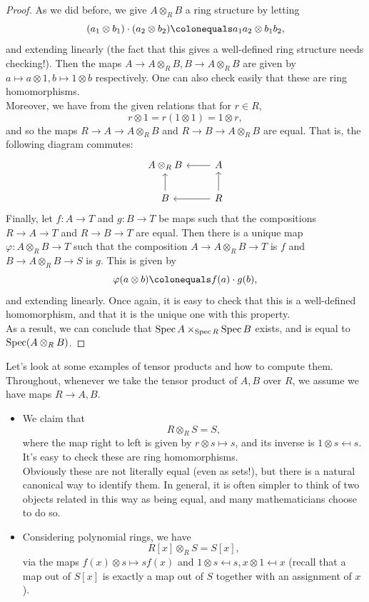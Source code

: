 \begin{proof}
    As we did before, we give $A\otimes_RB$ a ring structure by letting
    \[
    (a_1\otimes b_1)\cdot (a_2\otimes b_2)\colonequals a_1a_2\otimes b_1b_2,
    \]
    and extending linearly (the fact that this gives a well-defined ring structure needs checking!). Then the maps $A\to A\otimes_RB, B\to A\otimes_RB$ are given by $a\mapsto a\otimes1,b\mapsto 1\otimes b$ respectively. One can also check easily that these are ring homomorphisms. \\
    Moreover, we have from the given relations that for $r\in R$,
    \[
    r\otimes 1=r(1\otimes 1)=1\otimes r,
    \]
    and so the maps $R\to A\to A\otimes_RB$ and $R\to B\to A\otimes _RB$ are equal. That is, the following diagram commutes:
\[\begin{tikzcd}
	{A\otimes_RB} & A \\
	B & R
	\arrow[from=1-2, to=1-1]
	\arrow[from=2-1, to=1-1]
	\arrow[from=2-2, to=1-2]
	\arrow[from=2-2, to=2-1]
\end{tikzcd}\]
    Finally, let $f:A\to T$ and $g:B\to T$ be maps such that the compositions $R\to A\to T$ and $R\to B\to T$ are equal. Then there is a unique map $\varphi:A\otimes_RB\to T$ such that the composition $A\to A\otimes_RB\to T$ is $f$ and $B\to A\otimes_RB\to S$ is $g$. This is given by
    \[
    \varphi(a\otimes b)\colonequals f(a)\cdot g(b),
    \]
    and extending linearly. Once again, it is easy to check that this is a well-defined homomorphism, and that it is the unique one with this property. \\
    As a result, we can conclude that $\operatorname{Spec} A\times_{\operatorname{Spec} R}\operatorname{Spec} B$ exists, and is equal to $\operatorname{Spec}(A\otimes_RB)$. 
\end{proof}
Let's look at some examples of tensor products and how to compute them. Throughout, whenever we take the tensor product of $A,B$ over $R$, we assume we have maps $R\to A,B$.
\begin{example}\text{  }
    \begin{itemize}
        \item We claim that
        \[
        R\otimes_RS=S,
        \]
        where the map right to left is given by $r\otimes s\mapsto s$, and its inverse is $1\otimes s\mapsfrom s$. It's easy to check these are ring homomorphisms. \\
        Obviously these are not literally equal (even as sets!), but there is a natural canonical way to identify them. In general, it is often simpler to think of two objects related in this way as being equal, and many mathematicians choose to do so. 
        \item Considering polynomial rings, we have
        \[
        R[x]\otimes_R S=S[x],
        \]
        via the maps $f(x)\otimes s\mapsto sf(x)$ and $1\otimes s\mapsfrom s, x\otimes 1\mapsfrom x$ (recall that a map out of $S[x]$ is exactly a map out of $S$ together with an assignment of $x$).
    \end{itemize}
\end{example}
